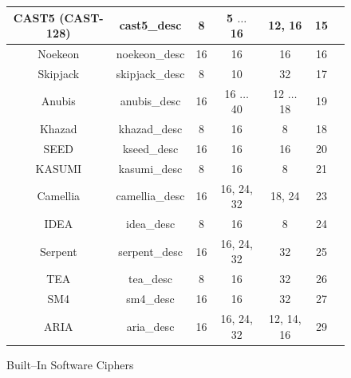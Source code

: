 \documentclass[synpaper]{book}
\begin{document}
\begin{figure}[hpbt]
\begin{small}
\begin{center}
\begin{tabular}{|c|c|c|c|c|c|c|}
     \hline CAST5 (CAST-128) & cast5\_desc & 8 & 5 $\ldots$ 16 & 12, 16 & 15 \\
     \hline Noekeon & noekeon\_desc & 16 & 16 & 16 & 16 \\
     \hline Skipjack & skipjack\_desc & 8 & 10 & 32 & 17 \\
     \hline Anubis & anubis\_desc & 16 & 16 $\ldots$ 40 & 12 $\ldots$ 18 & 19 \\
     \hline Khazad & khazad\_desc & 8 & 16 & 8 & 18 \\
     \hline SEED   & kseed\_desc & 16 & 16 & 16 & 20 \\
     \hline KASUMI & kasumi\_desc & 8 & 16 & 8 & 21 \\
     \hline Camellia & camellia\_desc & 16 & 16, 24, 32 & 18, 24 & 23 \\
     \hline IDEA & idea\_desc & 8 & 16 & 8 & 24 \\
     \hline Serpent & serpent\_desc & 16 & 16, 24, 32 & 32 & 25 \\
     \hline TEA & tea\_desc & 8 & 16 & 32 & 26 \\
     \hline SM4 & sm4\_desc & 16 & 16 & 32 & 27 \\
     \hline ARIA & aria\_desc & 16 & 16, 24, 32 & 12, 14, 16 & 29 \\
     \hline
\end{tabular}
\end{center}
\end{small}
\caption{Built--In Software Ciphers}
\end{figure}
\end{document}
